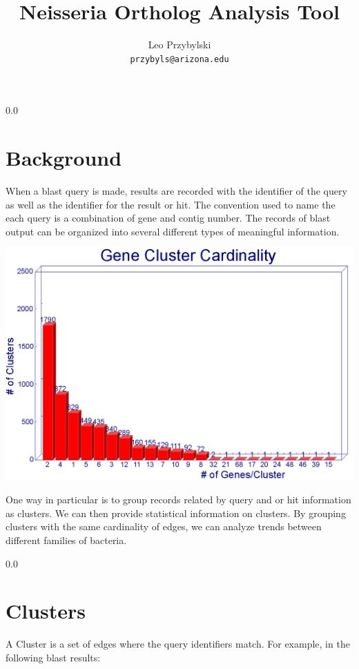 \documentclass[11pt,notitlepage]{article}
\title{Neisseria Ortholog Analysis Tool}
\author{Leo Przybylski\\
\texttt{przybyls@arizona.edu}}
\begin{document}
  \maketitle
  \tableofcontents

  \abstract{\ldots
}
  {\setlength{\baselineskip}%
           {0.0\baselineskip}
  \section*{\hfill Background}
  \hrulefill \par}
  When a blast query is made, results are recorded with the identifier of the query
  as well as the identifier for the result or hit. The convention used to name the
  each query is a combination of gene and contig number. The records of blast output
  can be organized into several different types of meaningful information.



  \includegraphics[width=145mm]{i90_a90_graph.png}


  One way in particular is to group records related by query and or hit information as
  clusters. We can then provide statistical information on clusters. By grouping clusters
  with the same cardinality of edges, we can analyze trends between different families
  of bacteria.  

  {\setlength{\baselineskip}%
           {0.0\baselineskip}
  \section*{\hfill Clusters}
  \hrulefill \par}
  A Cluster is a set of edges where the query identifiers match. For example, in the
  following blast results:
\end{document}
